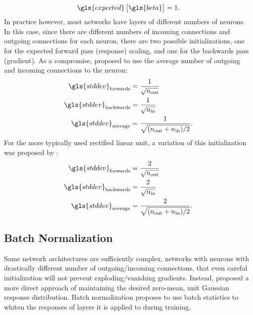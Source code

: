 \documentclass[thesis]{subfiles}
\begin{document}
\begin{equation}
	\gls{expected}\left[\gls{beta}\right] = 1.
\end{equation}
In practice however, most networks have layers of different numbers of neurons. In this case, since there are different numbers of incoming connections and outgoing connections for each neuron, there are two possible initializations, one for the expected forward pass (response) scaling, and one for the backwards pass (gradient). As a compromise, \citet{glorot2010understanding} proposed to use the average number of outgoing and incoming connections to the neuron:
%
\begin{equation}
\begin{aligned}
	\gls{stddev}_{\textrm{forwards}} &= \frac{1}{\sqrt{n_{\text{out}}}}\\
	\gls{stddev}_{\textrm{backwards}} &= \frac{1}{\sqrt{n_{\text{in}}}}\\
	\gls{stddev}_{\textrm{average}} &= \frac{1}{\sqrt{(n_{\text{out}} + n_{\text{in}})/2}}.
\end{aligned}
\end{equation}
%
For the more typically used rectified linear unit, a variation of this initialization was proposed by \citet{He2015b}:
%
\begin{equation}
\begin{aligned}
	\gls{stddev}_{\textrm{forwards}} &= \frac{2}{\sqrt{n_{\text{out}}}}\\
	\gls{stddev}_{\textrm{backwards}} &= \frac{2}{\sqrt{n_{\text{in}}}}\\
	\gls{stddev}_{\textrm{average}} &= \frac{2}{\sqrt{(n_{\text{out}} + n_{\text{in}})/2}}.
\end{aligned}
\end{equation}
%
\subsection{Batch Normalization}
Some network architectures are sufficiently complex, \ie networks with neurons with drastically different number of outgoing/incoming connections, that even careful initialization will not prevent exploding/vanishing gradients. Instead, \citet{Ioffe2015} proposed a more direct approach of maintaining the desired zero-mean, unit Gaussian response distribution. Batch normalization proposes to use batch statistics to whiten the responses of layers it is applied to during training.
\end{document}

